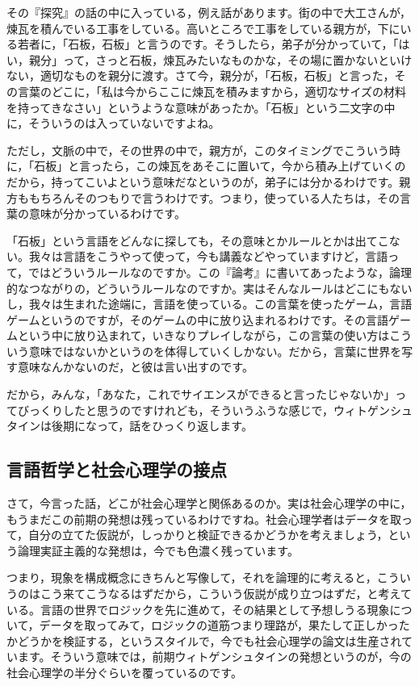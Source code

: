 \documentclass{ltjsbook}
\begin{document}
その『探究』の話の中に入っている，例え話があります。街の中で大工さんが，煉瓦を積んでいる工事をしている。高いところで工事をしている親方が，下にいる若者に，「石板，石板」と言うのです。そうしたら，弟子が分かっていて，「はい，親分」って，さっと石板，煉瓦みたいなものかな，その場に置かないといけない，適切なものを親分に渡す。さて今，親分が，「石板，石板」と言った，その言葉のどこに，「私は今からここに煉瓦を積みますから，適切なサイズの材料を持ってきなさい」というような意味があったか。「石板」という二文字の中に，そういうのは入っていないですよね。

ただし，文脈の中で，その世界の中で，親方が，このタイミングでこういう時に，「石板」と言ったら，この煉瓦をあそこに置いて，今から積み上げていくのだから，持ってこいよという意味だなというのが，弟子には分かるわけです。親方ももちろんそのつもりで言うわけです。つまり，使っている人たちは，その言葉の意味が分かっているわけです。

「石板」という言語をどんなに探しても，その意味とかルールとかは出てこない。我々は言語をこうやって使って，今も講義などやっていますけど，言語って，ではどういうルールなのですか。この『論考』に書いてあったような，論理的なつながりの，どういうルールなのですか。実はそんなルールはどこにもないし，我々は生まれた途端に，言語を使っている。この言葉を使ったゲーム，言語ゲームというのですが，そのゲームの中に放り込まれるわけです。その言語ゲームという中に放り込まれて，いきなりプレイしながら，この言葉の使い方はこういう意味ではないかというのを体得していくしかない。だから，言葉に世界を写す意味なんかないのだ，と彼は言い出すのです。

だから，みんな，「あなた，これでサイエンスができると言ったじゃないか」ってびっくりしたと思うのですけれども，そういうふうな感じで，ウィトゲンシュタインは後期になって，話をひっくり返します。

\subsection{言語哲学と社会心理学の接点}
さて，今言った話，どこが社会心理学と関係あるのか。実は社会心理学の中に，もうまだこの前期の発想は残っているわけですね。社会心理学者はデータを取って，自分の立てた仮説が，しっかりと検証できるかどうかを考えましょう，という論理実証主義的な発想は，今でも色濃く残っています。

つまり，現象を構成概念にきちんと写像して，それを論理的に考えると，こういうのはこう来てこうなるはずだから，こういう仮説が成り立つはずだ，と考えている。言語の世界でロジックを先に進めて，その結果として予想しうる現象について，データを取ってみて，ロジックの道筋つまり理路が，果たして正しかったかどうかを検証する，というスタイルで，今でも社会心理学の論文は生産されています。そういう意味では，前期ウィトゲンシュタインの発想というのが，今の社会心理学の半分ぐらいを覆っているのです。
\end{document}
